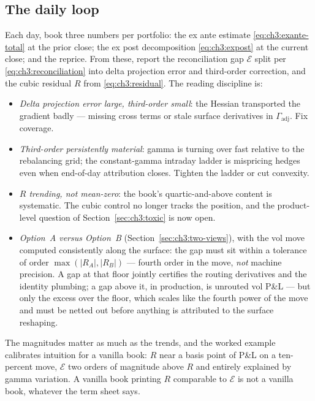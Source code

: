 \documentclass[11pt]{book}
\theoremstyle{plain}
\theoremstyle{definition}
\theoremstyle{remark}
\newcommand{\Gadj}{\Gamma_{\mathrm{adj}}}        %
\begin{document}
\subsection{The daily loop}\label{sec:ch3:daily}

Each day, book three numbers per portfolio: the ex ante estimate
\eqref{eq:ch3:exante-total} at the prior close; the ex post decomposition
\eqref{eq:ch3:expost} at the current close; and the reprice. From these,
report the reconciliation gap $\mathcal{E}$ split per
\eqref{eq:ch3:reconciliation} into delta projection error and third-order
correction, and the cubic residual $R$ from \eqref{eq:ch3:residual}. The
reading discipline is:

\begin{itemize}
  \item \emph{Delta projection error large, third-order small}: the Hessian
        transported the gradient badly --- missing cross terms or stale
        surface derivatives in $\Gadj$. Fix coverage.
  \item \emph{Third-order persistently material}: gamma is turning over fast
        relative to the rebalancing grid; the constant-gamma intraday ladder
        is mispricing hedges even when end-of-day attribution closes.
        Tighten the ladder or cut convexity.
  \item \emph{$R$ trending, not mean-zero}: the book's quartic-and-above
        content is systematic. The cubic control no longer tracks the
        position, and the product-level question of
        Section~\ref{sec:ch3:toxic} is now open.
  \item \emph{Option~A versus Option~B} (Section~\ref{sec:ch3:two-views}),
        with the vol move computed consistently along the surface: the gap
        must sit within a tolerance of order $\max(|R_A|, |R_B|)$ --- fourth
        order in the move, \emph{not} machine precision. A gap at that floor
        jointly certifies the routing derivatives and the identity plumbing;
        a gap above it, in production, is unrouted vol P\&L --- but only the
        excess over the floor, which scales like the fourth power of the
        move and must be netted out before anything is attributed to the
        surface reshaping.
\end{itemize}

The magnitudes matter as much as the trends, and the worked example
calibrates intuition for a vanilla book: $R$ near a basis point of P\&L on a
ten-percent move, $\mathcal{E}$ two orders of magnitude above $R$ and
entirely explained by gamma variation. A vanilla book printing $R$
comparable to $\mathcal{E}$ is not a vanilla book, whatever the term sheet
says.
\end{document}
